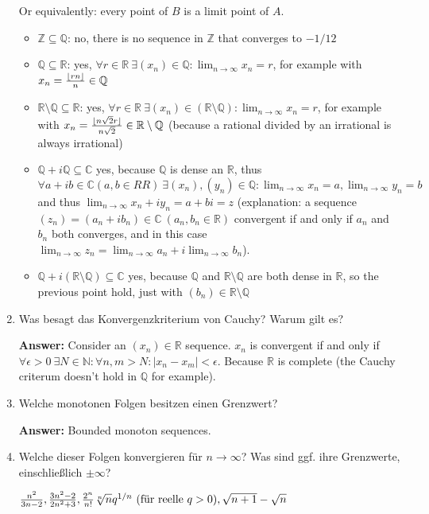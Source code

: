 \documentclass[11pt]{article}
\newcommand{\abs}[1]{\left|#1\right|}
\newcommand{\RR}[0]{\mathbb{R}}
\newcommand{\CC}[0]{\mathbb{C}}
\newcommand{\QQ}[0]{\mathbb{Q}}
\newcommand{\ZZ}[0]{\mathbb{Z}}
\newcommand{\NN}[0]{\mathbb{N}}
\DeclarePairedDelimiter\floor{\lfloor}{\rfloor}
\begin{document}
\begin{enumerate}
    Or equivalently: every point of $B$ is a limit point of $A$.
    \begin{itemize}
        \item $\ZZ \subseteq \QQ$: no, there is no sequence in $\ZZ$ that converges to $-1/12$
        \item $\QQ \subseteq \RR$: yes, $\forall r\in \RR~\exists(x_n)\in \QQ\colon \lim_{n\to\infty}x_n = r$, for example with $x_n = \frac{\floor{r n}}{n} \in \QQ$ 
        \item $\RR \setminus \QQ \subseteq \RR$: yes, $\forall r\in\RR~\exists(x_n) \in (\RR \setminus \QQ)\colon \lim_{n\to\infty} x_n = r$, for example with $x_n = \frac{\floor{n \sqrt{2} r}}{n \sqrt{2}} \in \RR \setminus \QQ$ (because a rational divided by an irrational is always irrational)
        \item $\QQ + i\QQ \subseteq \CC$ yes, because $\QQ$ is dense an $\RR$, thus $\forall a + ib \in \CC (a, b \in RR)~\exists (x_n), (y_n) \in \QQ\colon \lim_{n\to\infty} x_n = a, \lim_{n\to\infty} y_n = b$ and thus $\lim_{n\to\infty} x_n + i y_n = a + b i = z$ (explanation: a sequence $(z_n) = (a_n + i b_n) \in \CC~(a_n, b_n \in \RR)$ convergent if and only if $a_n$ and $b_n$ both converges, and in this case $\lim_{n\to\infty} z_n = \lim_{n\to\infty} a_n + i\lim_{n\to\infty}b_n$).
        \item $\QQ + i(\RR\setminus\QQ) \subseteq \CC$ yes, because $\QQ$ and $\RR \setminus \QQ$ are both dense in $\RR$, so the previous point hold, just with $(b_n) \in \RR\setminus\QQ$
    \end{itemize}
    \item Was besagt das Konvergenzkriterium von Cauchy? Warum gilt es?
    
    \textbf{Answer:} Consider an $(x_n) \in \RR$ sequence. $x_n$ is convergent if and only if $\forall \epsilon > 0~\exists N \in \NN\colon \forall n, m > N\colon \abs{x_n - x_m} < \epsilon$. Because $\RR$ is complete (the Cauchy criterum doesn't hold in $\QQ$ for example).

    \item Welche monotonen Folgen besitzen einen Grenzwert?
    
    \textbf{Answer:} Bounded monoton sequences.

    \item Welche dieser Folgen konvergieren für $n \to \infty$? Was sind ggf. ihre Grenzwerte, einschließlich $\pm \infty$?

    \hspace*{\fill}
    $\frac{n^2}{3n - 2}, \hfill \frac{3n^2 - 2}{2n^2+3},\hfill \frac{2^n}{n!} \hfill \sqrt[n]{n} \hfill q^{1/n}~(\text{für reelle }q > 0), \hfill \sqrt{n+1} - \sqrt{n}\hfill$
    \hspace*{\fill}
    

\end{enumerate}
\end{document}
